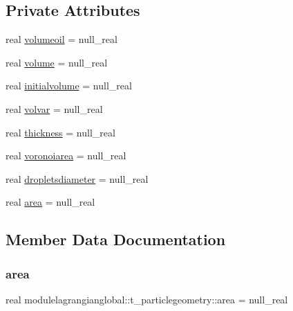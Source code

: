 \subsection*{Private Attributes}
\begin{DoxyCompactItemize}
\item 
real \mbox{\hyperlink{structmodulelagrangianglobal_1_1t__particlegeometry_a5763aaf53c92bb1b43b7c03bee71fe58}{volumeoil}} = null\+\_\+real
\item 
real \mbox{\hyperlink{structmodulelagrangianglobal_1_1t__particlegeometry_a78af7b7b29b50972abcbb48b420dc0af}{volume}} = null\+\_\+real
\item 
real \mbox{\hyperlink{structmodulelagrangianglobal_1_1t__particlegeometry_a794d493d8707bbd4bf00d7b4bba65470}{initialvolume}} = null\+\_\+real
\item 
real \mbox{\hyperlink{structmodulelagrangianglobal_1_1t__particlegeometry_ac616e051c66ad1f4ea349f4f96a382db}{volvar}} = null\+\_\+real
\item 
real \mbox{\hyperlink{structmodulelagrangianglobal_1_1t__particlegeometry_adb65699143061517c111e1e5fbf2c2c2}{thickness}} = null\+\_\+real
\item 
real \mbox{\hyperlink{structmodulelagrangianglobal_1_1t__particlegeometry_a4864749591b6adb6c59f4e439653c4c7}{voronoiarea}} = null\+\_\+real
\item 
real \mbox{\hyperlink{structmodulelagrangianglobal_1_1t__particlegeometry_ae9ab9ab895b946e348f4b16a9062f76c}{dropletsdiameter}} = null\+\_\+real
\item 
real \mbox{\hyperlink{structmodulelagrangianglobal_1_1t__particlegeometry_aab9fefadfb4b6da536364e192a4b1cde}{area}} = null\+\_\+real
\end{DoxyCompactItemize}


\subsection{Member Data Documentation}
\mbox{\label{structmodulelagrangianglobal_1_1t__particlegeometry_aab9fefadfb4b6da536364e192a4b1cde}} 
\subsubsection{\texorpdfstring{area}{area}}
{\footnotesize\ttfamily real modulelagrangianglobal\+::t\+\_\+particlegeometry\+::area = null\+\_\+real\hspace{0.3cm}{\ttfamily [private]}}

